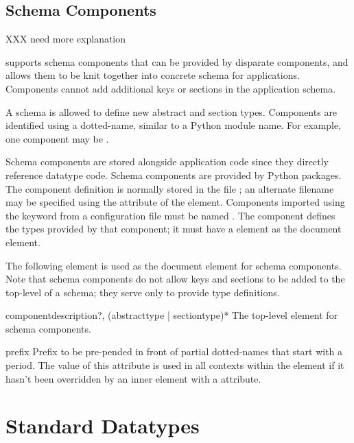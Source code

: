 \documentclass{howto}
\newcommand{\datatype}[1]{\strong{#1}}
\begin{document}
\subsection{Schema Components \label{schema-components}}

XXX need more explanation

 supports schema components that can be
provided by disparate components, and allows them to be knit together
into concrete schema for applications.  Components cannot add
additional keys or sections in the application schema.

A schema  is allowed to define new abstract and
section types.
Components are identified using a dotted-name, similar to a Python
module name.  For example, one component may be .

Schema components are stored alongside application code since they
directly reference datatype code.  Schema components are provided by
Python packages.  The component definition is normally stored in the
file ; an alternate filename may be specified
using the  attribute of the  element.
Components imported using the  keyword from a
configuration file must be named .
The component defines the types provided by that component; it must
have a  element as the document element.

The following element is used as the document element for schema
components.  Note that schema components do not allow keys and
sections to be added to the top-level of a schema; they serve only to
provide type definitions.

\begin{elementdesc}{component}{description?, (abstracttype | sectiontype)*}
  The top-level element for schema components.

  \begin{attributedesc}{prefix}{\datatype{dotted-name}}
    Prefix to be pre-pended in front of partial dotted-names that
    start with a period.  The value of this attribute is used in all
    contexts within the  element if it hasn't been
    overridden by an inner element with a 
    attribute.
  \end{attributedesc}
\end{elementdesc}


\section{Standard  Datatypes\label{standard-datatypes}}
\end{document}

